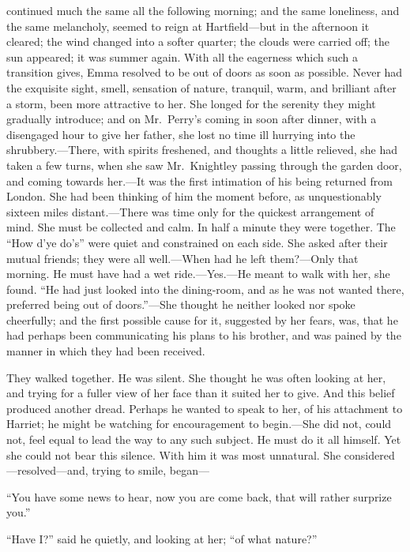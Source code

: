  continued much the same all the following morning;
and the same loneliness, and the same melancholy, seemed to
reign at Hartfield---but in the afternoon it cleared; the wind
changed into a softer quarter; the clouds were carried off;
the sun appeared; it was summer again.  With all the eagerness
which such a transition gives, Emma resolved to be out of doors
as soon as possible.  Never had the exquisite sight, smell,
sensation of nature, tranquil, warm, and brilliant after a storm,
been more attractive to her.  She longed for the serenity they might
gradually introduce; and on Mr.\ Perry's coming in soon after dinner,
with a disengaged hour to give her father, she lost no time ill
hurrying into the shrubbery.---There, with spirits freshened,
and thoughts a little relieved, she had taken a few turns, when she
saw Mr.\ Knightley passing through the garden door, and coming
towards her.---It was the first intimation of his being returned
from London.  She had been thinking of him the moment before,
as unquestionably sixteen miles distant.---There was time only for
the quickest arrangement of mind.  She must be collected and calm.
In half a minute they were together.  The ``How d'ye do's'' were quiet
and constrained on each side.  She asked after their mutual friends;
they were all well.---When had he left them?---Only that morning.
He must have had a wet ride.---Yes.---He meant to walk with her,
she found.  ``He had just looked into the dining-room, and as he
was not wanted there, preferred being out of doors.''---She thought
he neither looked nor spoke cheerfully; and the first possible
cause for it, suggested by her fears, was, that he had perhaps been
communicating his plans to his brother, and was pained by the manner
in which they had been received.

They walked together.  He was silent.  She thought he was often
looking at her, and trying for a fuller view of her face than it
suited her to give.  And this belief produced another dread.
Perhaps he wanted to speak to her, of his attachment to Harriet;
he might be watching for encouragement to begin.---She did not,
could not, feel equal to lead the way to any such subject.
He must do it all himself.  Yet she could not bear this silence.
With him it was most unnatural.  She considered---resolved---and, trying
to smile, began---%

``You have some news to hear, now you are come back, that will rather
surprize you.''

``Have I?'' said he quietly, and looking at her; ``of what nature?''


